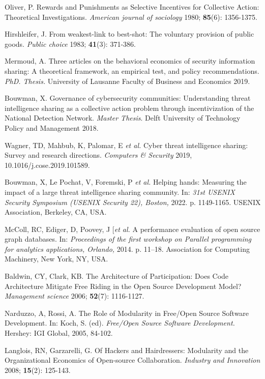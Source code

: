 \documentclass[unnumsec,webpdf,contemporary,large]{oup-authoring-template}%
\theoremstyle{thmstyleone}%
\theoremstyle{thmstyletwo}%
\theoremstyle{thmstylethree}%
\begin{document}
\begin{thebibliography}{10}
Oliver, P. Rewards and Punishments as Selective Incentives for Collective Action: Theoretical Investigations. {\em American journal of sociology} 1980; {\bf 85}(6): 1356-1375.

Hirshleifer, J. From weakest-link to best-shot: The voluntary provision of public goods. {\em Public choice} 1983; {\bf 41}(3): 371-386.

Mermoud, A. Three articles on the behavioral economics of security information
sharing: A theoretical framework, an empirical test, and policy recommendations. {\em PhD. Thesis.} University of Lausanne Faculty of Business and Economics 2019.

Bouwman, X. Governance of cybersecurity communities: Understanding threat intelligence sharing as a collective action problem through incentivization of the National
Detection Network. {\em Master Thesis}. Delft University of Technology Policy and Management 2018.

Wagner, TD, Mahbub, K, Palomar, E {\em et al.} Cyber threat intelligence sharing: Survey and research directions. {\em Computers \& Security} 2019, 10.1016/j.cose.2019.101589.

Bouwman, X, Le Pochat, V, Foremski, P {\em et al.} Helping hands: Measuring the impact of a large threat intelligence sharing community. In: {\em 31st USENIX Security Symposium (USENIX Security 22), Boston,} 2022. p. 1149-1165. USENIX Association, Berkeley, CA, USA.

McColl, RC, Ediger, D, Poovey, J {[\em et al.} A performance evaluation of open source graph databases. In: {\em Proceedings of the first workshop on Parallel programming for analytics applications, Orlando,} 2014. p. 11–18. Association for Computing Machinery, New York, NY, USA.

Baldwin, CY, Clark, KB. The Architecture of Participation: Does Code Architecture Mitigate Free Riding in the Open Source Development Model? {\em Management science} 2006; {\bf 52}(7): 1116-1127.

Narduzzo, A, Rossi, A. The Role of Modularity in Free/Open Source Software Development. In: Koch, S. (ed). {\em Free/Open Source Software Development.} Hershey: IGI Global, 2005, 84-102.

Langlois, RN, Garzarelli, G. Of Hackers and Hairdressers: Modularity and the Organizational Economics of Open-source Collaboration. {\em Industry and Innovation} 2008; {\bf 15}(2): 125-143.


\end{thebibliography}
\end{document}
